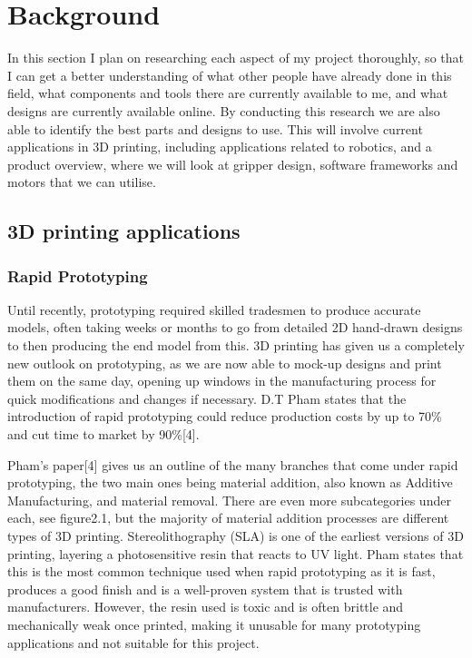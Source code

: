 \documentclass{l4proj}
\begin{document}
\chapter{Background}
In this section I plan on researching each aspect of my project thoroughly, so that I can get a better understanding of what other people have already done in this field, what components and tools there are currently available to me, and what designs are currently available online. By conducting this research we are also able to identify the best parts and designs to use. This will involve current applications in 3D printing, including applications related to robotics, and a product overview, where we will look at gripper design, software frameworks and motors that we can utilise. 

\section{3D printing applications}
\subsection{Rapid Prototyping}
Until recently, prototyping required skilled tradesmen to produce accurate models, often taking weeks or months to go from detailed 2D hand-drawn designs to then producing the end model from this. 3D printing has given us a completely new outlook on prototyping, as we are now able to mock-up designs and print them on the same day, opening up windows in the manufacturing process for quick modifications and changes if necessary. D.T Pham states that the introduction of rapid prototyping could reduce production costs by up to 70\% and cut time to market by 90\%[4]. 

Pham's paper[4] gives us an outline of the many branches that come under rapid prototyping, the two main ones being material addition, also known as Additive Manufacturing, and material removal. There are even more subcategories under each, see figure2.1, but the majority of material addition processes are different types of 3D printing. Stereolithography (SLA) is one of the earliest versions of 3D printing, layering a photosensitive resin that reacts to UV light. Pham states that this is the most common technique used when rapid prototyping as it is fast, produces a good finish and is a well-proven system that is trusted with manufacturers. However, the resin used is toxic and is often brittle and mechanically weak once printed, making it unusable for many prototyping applications and not suitable for this project.
\end{document}
